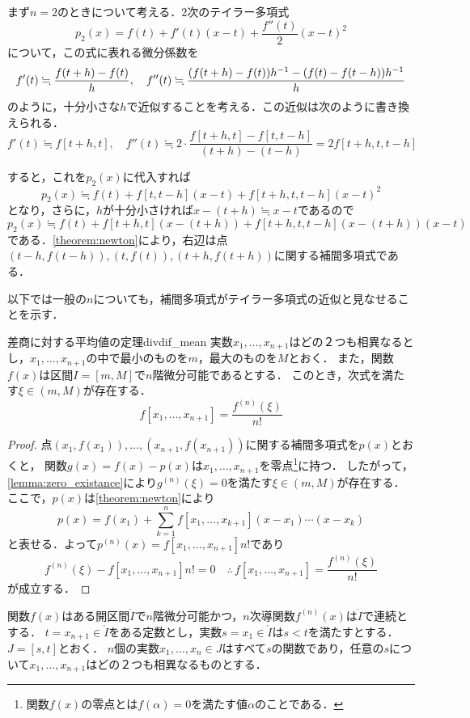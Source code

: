 \documentclass[a4paper]{ltjsarticle}
\theoremstyle{definition}
\DeclarePairedDelimiter{\pqty}{\lparen}{\rparen}
\begin{document}
まず$n=2$のときについて考える．$2$次のテイラー多項式
\[
  p_2(x)=f(t)+f'(t)(x-t)+\frac{f''(t)}{2}(x-t)^2
\]
について，この式に表れる微分係数を
\[
  f'(t)\fallingdotseq\frac{f(t+h)-f(t)}{h},\quad f''(t)\fallingdotseq\frac{\pqty*{f(t+h)-f(t)}h^{-1}-\pqty*{f(t)-f(t-h)}h^{-1}}{h}
\]
のように，十分小さな$h$で近似することを考える．この近似は次のように書き換えられる．
\[
  f'(t)\fallingdotseq f[t+h,t],\quad f''(t)\fallingdotseq 2\cdot\frac{f[t+h,t]-f[t,t-h]}{(t+h)-(t-h)}=2f[t+h,t,t-h]
\]

すると，これを$p_2(x)$に代入すれば
\[
  p_2(x)\fallingdotseq f(t)+f[t,t-h](x-t)+f[t+h,t,t-h](x-t)^2
\]
となり，さらに，$h$が十分小さければ$x-(t+h)\fallingdotseq x-t$であるので
\[
  p_2(x)\fallingdotseq f(t)+f[t+h,t](x-(t+h))+f[t+h,t,t-h](x-(t+h))(x-t)
\]
である．\cref{theorem:newton}により，右辺は点$(t-h,f(t-h)),(t,f(t)),(t+h,f(t+h))$に関する補間多項式である．

以下では一般の$n$についても，補間多項式がテイラー多項式の近似と見なせることを示す．

\begin{theorem}{差商に対する平均値の定理}{divdif_mean}
  実数$x_1,\dots,x_{n+1}$はどの２つも相異なるとし，$x_1,\dots,x_{n+1}$の中で最小のものを$m$，最大のものを$M$とおく．
  また，関数$f(x)$は区間$I = [m, M]$で$n$階微分可能であるとする．
  このとき，次式を満たす$\xi \in (m, M)$が存在する．
  \[
    f[x_1,\dots,x_{n+1}] = \frac{f^{(n)}(\xi)}{n!}
  \]
\end{theorem}

\begin{proof}
  点$(x_1,f(x_1)),\dots,(x_{n+1},f(x_{n+1}))$に関する補間多項式を$p(x)$とおくと，
  関数$g(x)=f(x)-p(x)$は$x_1,\dots,x_{n+1}$を零点\footnote{関数$f(x)$の零点とは$f(\alpha)=0$を満たす値$\alpha$のことである．}に持つ．
  したがって，\cref{lemma:zero_existance}により$g^{(n)}(\xi)=0$を満たす$\xi\in (m, M)$が存在する．
  ここで，$p(x)$は\cref{theorem:newton}により
  \[
    p(x) = f(x_1) + \sum_{k=1}^{n} f[x_1,\dots,x_{k+1}] (x-x_1) \cdots (x-x_k)
  \]
  と表せる．よって$p^{(n)}(x) = f[x_1,\dots,x_{n+1}]n!$であり
  \[
    f^{(n)}(\xi) - f[x_1,\dots,x_{n+1}]n! = 0
    \quad\therefore\,
    f[x_1,\dots,x_{n+1}] = \frac{f^{(n)}(\xi)}{n!}
  \]
  が成立する．
\end{proof}

関数$f(x)$はある開区間$\mathring{I}$で$n$階微分可能かつ，$n$次導関数$f^{(n)}(x)$は$\mathring{I}$で連続とする．
$t=x_{n+1}\in\mathring{I}$をある定数とし，実数$s=x_1\in\mathring{I}$は$s<t$を満たすとする．$J=[s,t]$とおく．
$n$個の実数$x_1,\dots,x_n \in J$はすべて$s$の関数であり，任意の$s$について$x_1,\dots,x_{n+1}$はどの２つも相異なるものとする．
\end{document}
